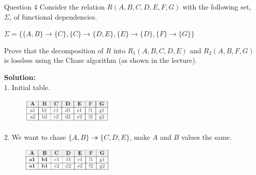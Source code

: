 \begin{frame}[fragile]{Question 4}
	Consider the relation $R(A,B,C,D,E,F,G)$ with the following set, $\Sigma$, of functional dependencies.\\ \vspace{5pt}
	
	$\Sigma=\{\{A,B\}\rightarrow\{C\},\{C\}\rightarrow\{D,E\},\{E\}\rightarrow\{D\},\{F\}\rightarrow\{G\}\}$\\ \vspace{5pt}
	
	Prove that the decomposition of $R$ into $R_1(A,B,C,D,E)$ and $R_2(A,B,F,G)$ is lossless using the Chase algorithm (as shown in the lecture).\\ \vspace{5pt}
	
	\textbf{Solution:}\\ \vspace{2pt}
	1. Initial table.\\
	\begin{figure}
		\includegraphics[width=0.4\textwidth, trim=0 0 0 0, clip]{4221-t5/images/4-1.png}
	\end{figure}
	
	2. We want to chase $\{A,B\} \twoheadrightarrow \{C,D,E\}$, make $A$ and $B$ values the same.\\
	\begin{figure}
		\includegraphics[width=0.4\textwidth, trim=0 0 0 0, clip]{4221-t5/images/4-2.png}
	\end{figure}	
\end{frame}

